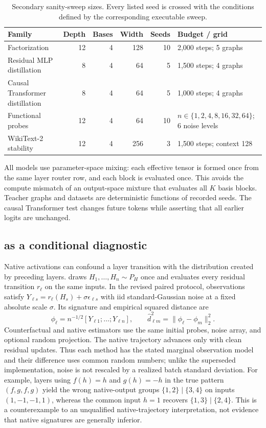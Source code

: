 \begin{table}[H]
\centering
\scriptsize
\caption{Secondary sanity-sweep sizes.  Every listed seed is crossed with the
conditions defined by the corresponding executable sweep.}
\label{tab:sweep-configs}
\begin{tabular}{lrrrrl}
\toprule
Family & Depth & Bases & Width & Seeds & Budget / grid \\
\midrule
Factorization & 12 & 4 & 128 & 10 & 2,000 steps; 5 graphs \\
Residual MLP distillation & 8 & 4 & 64 & 5 & 1,500 steps; 4 graphs \\
Causal Transformer distillation & 8 & 4 & 64 & 5 & 1,000 steps; 4 graphs \\
Functional probes & 12 & 4 & 64 & 10 & $n\in\{1,2,4,8,16,32,64\}$; 6 noise levels \\
WikiText-2 stability & 12 & 4 & 256 & 3 & 1,500 steps; context 128 \\
\bottomrule
\end{tabular}
\end{table}

All models use parameter-space mixing: each effective tensor is formed once
from the same layer router row, and each block is evaluated once.  This avoids
the compute mismatch of an output-space mixture that evaluates all $K$ basis
blocks.  Teacher graphs and datasets are deterministic functions of recorded
seeds.  The causal Transformer test changes future tokens while asserting that
all earlier logits are unchanged.

\subsection{\method{} as a conditional diagnostic}

Native activations can confound a layer transition with the distribution
created by preceding layers.  \method{} draws
$H_1,\ldots,H_n\sim P_H$ once and evaluates every residual transition $r_\ell$
on the same inputs.  In the revised paired protocol, observations satisfy
$Y_{\ell s}=r_\ell(H_s)+\sigma\epsilon_{\ell s}$ with iid standard-Gaussian
noise at a fixed absolute scale $\sigma$.  Its signature and empirical squared
distance are
\begin{equation}
  \phi_\ell=n^{-1/2}[Y_{\ell1};\ldots;Y_{\ell n}],\qquad
  \widehat d_{\ell m}^2=\|\phi_\ell-\phi_m\|_2^2.
  \label{eq:shareprobe}
\end{equation}
Counterfactual and native estimators use the same initial probes, noise array,
and optional random projection.  The native trajectory advances only with
clean residual updates.  Thus each method has the stated marginal observation
model and their difference uses common random numbers; unlike the superseded
implementation, noise is not rescaled by a realized batch standard deviation.
For example, layers using $f(h)=h$ and $g(h)=-h$ in the true pattern
$(f,g,f,g)$ yield the wrong native-output groups
$\{1,2\}\mid\{3,4\}$ on inputs $(1,-1,-1,1)$, whereas the common input $h=1$
recovers $\{1,3\}\mid\{2,4\}$.  This is a counterexample to an unqualified
native-trajectory interpretation, not evidence that native signatures are
generally inferior.

